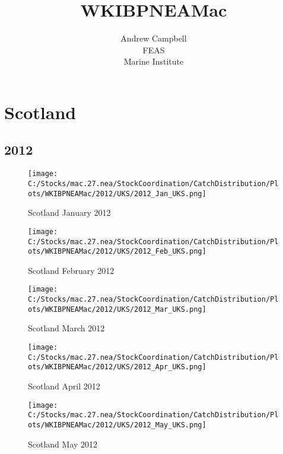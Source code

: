 \documentclass{article}
\begin{document}
\title{WKIBPNEAMac}
\author{Andrew Campbell \\ FEAS \\ Marine Institute}
\maketitle

\tableofcontents

\section{Scotland}



\newpage

\subsection{2012}



\begin{figure}[h]
	\centering
		\texttt{[image: C:/Stocks/mac.27.nea/StockCoordination/CatchDistribution/Plots/WKIBPNEAMac/2012/UKS/2012\_Jan\_UKS.png]}
	\caption{Scotland January 2012}
	\label{fig:2012_Jan_UKS}
\end{figure}

\begin{figure}
	\centering
		\texttt{[image: C:/Stocks/mac.27.nea/StockCoordination/CatchDistribution/Plots/WKIBPNEAMac/2012/UKS/2012\_Feb\_UKS.png]}
	\caption{Scotland February 2012}
	\label{fig:2012_Feb_UKS}
\end{figure}

\begin{figure}
	\centering
		\texttt{[image: C:/Stocks/mac.27.nea/StockCoordination/CatchDistribution/Plots/WKIBPNEAMac/2012/UKS/2012\_Mar\_UKS.png]}
	\caption{Scotland March 2012}
	\label{fig:2012_Mar_UKS}
\end{figure}

\begin{figure}
	\centering
		\texttt{[image: C:/Stocks/mac.27.nea/StockCoordination/CatchDistribution/Plots/WKIBPNEAMac/2012/UKS/2012\_Apr\_UKS.png]}
	\caption{Scotland April 2012}
	\label{fig:2012_Apr_UKS}
\end{figure}

\begin{figure}
	\centering
		\texttt{[image: C:/Stocks/mac.27.nea/StockCoordination/CatchDistribution/Plots/WKIBPNEAMac/2012/UKS/2012\_May\_UKS.png]}
	\caption{Scotland May 2012}
	\label{fig:2012_May_UKS}
\end{figure}
\end{document}
